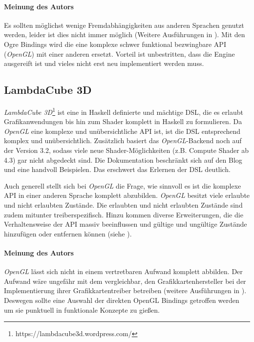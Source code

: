 \paragraph{Meinung des Autors} Es sollten möglichst wenige Fremdabhängigkeiten aus anderen Sprachen genutzt werden, leider ist dies nicht immer möglich (Weitere Ausführungen in ). Mit den Ogre Bindings wird die eine komplexe schwer funktional bezwingbare \acs{API} (\textit{OpenGL}) mit einer anderen ersetzt. Vorteil ist unbestritten, dass die Engine ausgereift ist und vieles nicht erst neu implementiert werden muss.

\subsection{LambdaCube 3D}

\textit{LambdaCube 3D}\footnote{https://lambdacube3d.wordpress.com/} ist eine in Haskell definierte und mächtige \ac{DSL}, die es erlaubt Grafikanwendungen bis hin zum Shader komplett in Haskell zu formulieren. Da \textit{OpenGL} eine komplexe und unübersichtliche \acs{API} ist, ist die \ac{DSL} entsprechend komplex und unübersichtlich. Zusätzlich basiert das \textit{OpenGL}-Backend noch auf der Version 3.2, sodass viele neue Shader-Möglichkeiten (z.B. Compute Shader ab 4.3) gar nicht abgedeckt sind. Die Dokumentation beschränkt sich auf den Blog und eine handvoll Beispielen. Das erschwert das Erlernen der DSL deutlich.

Auch generell stellt sich bei \textit{OpenGL} die Frage, wie sinnvoll es ist die komplexe \acs{API} in einer anderen Sprache komplett abzubilden. \textit{OpenGL} besitzt viele erlaubte und nicht erlaubten Zustände. Die erlaubten und nicht erlaubten Zustände sind zudem mitunter treiberspezifisch. Hinzu kommen diverse Erweiterungen, die die Verhaltensweise der \acs{API} massiv beeinflussen und gültige und ungültige Zustände hinzufügen oder entfernen können (siehe ).

\paragraph{Meinung des Autors} \textit{OpenGL} lässt sich nicht in einem vertretbaren Aufwand komplett abbilden. Der Aufwand wäre ungefähr mit dem vergleichbar, den Grafikkartenhersteller bei der Implementierung ihrer Grafikkartentreiber betreiben (weitere Ausführungen in ). Deswegen sollte eine Auswahl der direkten OpenGL Bindings getroffen werden um sie punktuell in funktionale Konzepte zu gießen.


